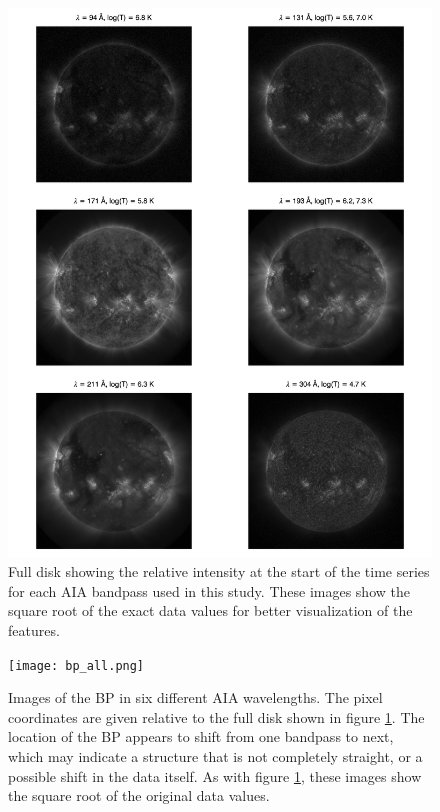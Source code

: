 \documentclass[preprint]{aastex}   %
\begin{document}
\begin{figure}[htb!]
    \includegraphics[width=\textwidth]{full_all.png}
    \caption{Full disk showing the relative intensity at the start of the time
        series for each AIA bandpass used in this study. These images show the
        square root of the exact data values for better visualization of the features. }
    \label{full}
\end{figure}

\begin{figure}[htb!]
    \texttt{[image: bp\_all.png]}
    \caption{Images of the BP in six different AIA wavelengths. The pixel coordinates
        are given relative to the full disk shown in figure \ref{full}. The
        location of the BP appears to shift from one bandpass to next, which
        may indicate a structure that is not completely straight, or a possible
        shift in the data itself. As with figure \ref{full}, these images show
        the square root of the original data values.}
    \label{bp_images}
\end{figure}
\end{document}
